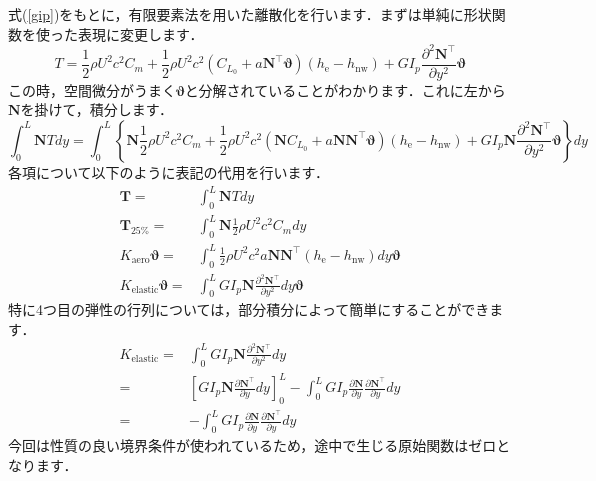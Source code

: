 \documentclass{jarticle}
\begin{document}
式(\ref{gip})をもとに，有限要素法を用いた離散化を行います．まずは単純に形状関数を使った表現に変更します．
\begin{equation} 
    T = \frac{1}{2}\rho U^2 c^2 C_m + \frac{1}{2}\rho U^2 c^2 (C_{L_0} + a\bm{N}^\top\bm{\vartheta})  (h_\mathrm{e}-h_\mathrm{nw}) + GI_p \frac{\partial^2 \bm{N}^\top}{\partial y^2}\bm{\vartheta}
\end{equation}
この時，空間微分がうまく$\bm{\vartheta}$と分解されていることがわかります．これに左から$\bm{N}$を掛けて，積分します．
\begin{equation} 
    \int_0^L \bm{N} T dy = \int_0^L \left\{ \bm{N} \frac{1}{2}\rho U^2 c^2 C_m +  \frac{1}{2}\rho U^2 c^2 (\bm{N}C_{L_0} + a\bm{N}\bm{N}^\top\bm{\vartheta})  (h_\mathrm{e}-h_\mathrm{nw}) + GI_p \bm{N} \frac{\partial^2 \bm{N}^\top}{\partial y^2}\bm{\vartheta} \right\} dy
\end{equation}
各項について以下のように表記の代用を行います．
\begin{align}
    \bm{T} =& \int_0^L \bm{N} T dy \\
    \bm{T}_\mathrm{25\%} =& \int_0^L \bm{N} \frac{1}{2}\rho U^2 c^2 C_m dy \\
    K_\mathrm{aero} \bm{\vartheta} =& \int_0^L  \frac{1}{2}\rho U^2 c^2 a\bm{N}\bm{N}^\top (h_\mathrm{e}-h_\mathrm{nw}) dy \bm{\vartheta} \\
    K_\mathrm{elastic} \bm{\vartheta} =& \int_0^L GI_p \bm{N} \frac{\partial^2 \bm{N}^\top}{\partial y^2} dy \bm{\vartheta}
\end{align}
特に4つ目の弾性の行列については，部分積分によって簡単にすることができます．
\begin{equation}
    \begin{split}
        K_\mathrm{elastic} =&  \int_0^L GI_p \bm{N} \frac{\partial^2 \bm{N}^\top}{\partial y^2} dy \\
                           =&  \left[ GI_p \bm{N} \frac{\partial \bm{N}^\top}{\partial y} dy  \right]_0^L - \int_0^L GI_p \frac{\partial \bm{N}}{\partial y} \frac{\partial \bm{N}^\top}{\partial y} dy \\
                           =&  - \int_0^L GI_p \frac{\partial \bm{N}}{\partial y} \frac{\partial \bm{N}^\top}{\partial y} dy
    \end{split}
\end{equation}
今回は性質の良い境界条件が使われているため，途中で生じる原始関数はゼロとなります．
\end{document}
